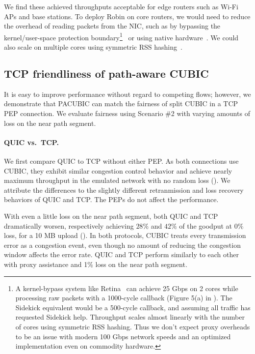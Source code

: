 We find these achieved throughputs acceptable for edge routers such as Wi-Fi
APs and base stations.
To deploy Robin on core routers, we would need to reduce the overhead of reading
packets from the NIC, such as by bypassing the kernel/user-space
protection boundary\footnote{
A kernel-bypass system like Retina~\cite{wan2022retina} can achieve
25 Gbps on 2 cores while processing raw packets with a 1000-cycle callback
(Figure 5(a) in \cite{wan2022retina}). The Sidekick equivalent would be a 500-cycle
callback, and assuming all traffic has requested Sidekick help. Throughput scales
almost linearly with the number of cores using symmetric RSS hashing.
Thus we don't expect proxy overheads to be an issue with modern 100 Gbps network
speeds and an optimized implementation even on commodity hardware.
}~\cite{dpdk,mccanne1993bsd,wan2022retina}
or using native hardware~\cite{bosshart2014p4}.
We could also scale on multiple cores using symmetric RSS hashing~\cite{woo2012scalable}.

\subsection{TCP friendliness of path-aware CUBIC}
\label{sec:sidekick:emulation:pacubic}



It is easy to improve performance without regard to competing flows;
however, we demonstrate that PACUBIC can
match the fairness of split CUBIC in a TCP PEP connection\@.
We evaluate fairness using Scenario \#2 with varying amounts of loss on the
near path segment.

\paragraph{QUIC vs.\ TCP\@.}
We first compare QUIC to TCP without either PEP\@.
As both connections use CUBIC, they exhibit similar
congestion control behavior and achieve nearly maximum throughput in the
emulated network with no random loss ().
We attribute the differences to the slightly different retranmission and
loss recovery behaviors of QUIC and TCP\@. The PEPs do not affect the
performance.

With even a little loss on the near path segment, both QUIC and TCP dramatically
worsen, respectively achieving $28\%$ and $42\%$ of the goodput at $0\%$ loss,
for a 10 MB upload ().
In both protocols, CUBIC treats every transmission error as a congestion event,
even though no amount of reducing the congestion window affects the error rate.
QUIC and TCP perform similarly to each other with proxy assistance and 1\%
loss on the near path segment.

